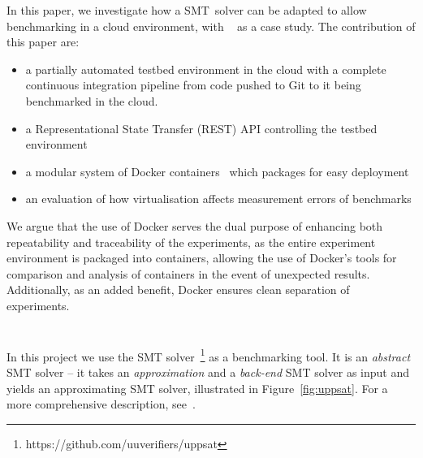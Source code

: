 \documentclass[a4paper]{IEEEtran}
\begin{document}

In this paper, we investigate how a SMT~solver can be adapted to allow
benchmarking in a cloud environment, with \uppsat{}~\cite{uppsat} as a
case study. The contribution of this paper are:

\begin{itemize}
  \item a partially automated testbed environment in the cloud with a
    complete continuous integration pipeline from code pushed to Git
    to it being benchmarked in the cloud.
    
  \item a Representational State Transfer (REST) API controlling the
    testbed environment
    
  \item a modular system of Docker containers~\cite{docker} which
    packages \uppsat{} for easy deployment

  \item an evaluation of how virtualisation affects measurement errors
    of benchmarks
\end{itemize}

We argue that the use of Docker serves the dual purpose of enhancing both
repeatability and traceability of the experiments, as the entire experiment
environment is packaged into containers, allowing the use of Docker's tools for
comparison and analysis of containers in the event of unexpected results.
Additionally, as an added benefit, Docker ensures clean separation of
experiments.


\section{\uppsat{}}
In this project we use the \uppsat{} SMT
solver~\footnote{https://github.com/uuverifiers/uppsat} as a
benchmarking tool. It is an \emph{abstract} SMT solver -- it takes an
\emph{approximation} and a \emph{back-end} SMT solver as input and
yields an approximating SMT solver, illustrated in
Figure~\ref{fig:uppsat}. For a more comprehensive description,
see~\cite{uppsat}.
\end{document}
